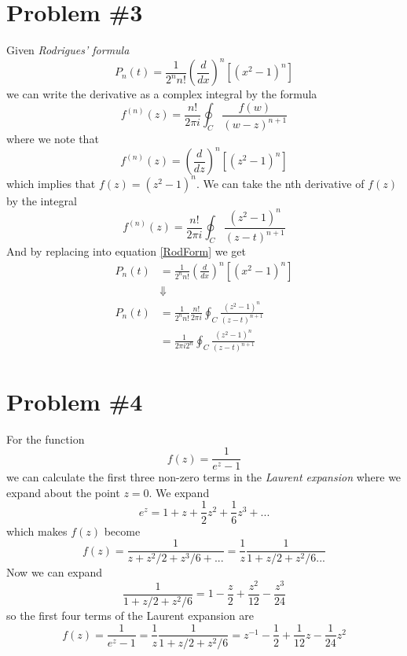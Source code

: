 \documentclass[11pt]{article}
\numberwithin{equation}{section}
\begin{document}
\pagebreak

\section{Problem \#3}
Given \emph{Rodrigues' formula} 
\begin{equation}
P_n(t) = \frac{1}{2^nn!}\left(\frac{d}{dx}\right)^n[(x^2-1)^n]
\label{RodForm}
\end{equation}
we can write the derivative as a complex integral by the formula
$$f^{(n)}(z) = \frac{n!}{2\pi{i}}\oint_{C}\frac{f(w)}{(w-z)^{n+1}}$$
where we note that
$$f^{(n)}(z) = \left(\frac{d}{dz}\right)^n[(z^2-1)^n]$$
which implies that $f(z) = (z^2-1)^n$. We can take the nth derivative of $f(z)$ by the 
integral
$$f^{(n)}(z) = \frac{n!}{2\pi{i}}\oint_{C}\frac{(z^2-1)^n}{(z-t)^{n+1}}$$
And by replacing into equation \ref{RodForm} we get
\begin{align*}
P_n(t) &= \frac{1}{2^nn!}\left(\frac{d}{dx}\right)^n[(x^2-1)^n]\\
&\Downarrow\\
P_n(t) &= \frac{1}{2^nn!}\frac{n!}{2\pi{i}}\oint_{C}\frac{(z^2-1)^n}{(z-t)^{n+1}}\\
&= \frac{1}{{2\pi{i}}2^n}\oint_{C}\frac{(z^2-1)^n}{(z-t)^{n+1}}
\end{align*}

\section{Problem \#4}
For the function 
$$f(z) = \frac{1}{e^z-1}$$
we can calculate the first three non-zero terms in the \emph{Laurent expansion} where we 
expand about the point $z=0$. We expand 
$$e^{z} = 1+z+\frac{1}{2}z^2+\frac{1}{6}z^3+...$$
which makes $f(z)$ become
$$f(z) = \frac{1}{z+z^2/2+z^3/6+...}=\frac{1}{z}\frac{1}{1+z/2+z^2/6...}$$
Now we can expand 
$$\frac{1}{1+z/2+z^2/6} = 1 - \frac{z}{2} + \frac{z^2}{12} - \frac{z^3}{24}$$
so the first four terms of the Laurent expansion are
$$f(z) = \frac{1}{e^z-1} = \frac{1}{z}\frac{1}{1+z/2+z^2/6} = z^{-1} - \frac{1}{2} + \frac{1}{12}z - \frac{1}{24}z^2$$
\end{document}

